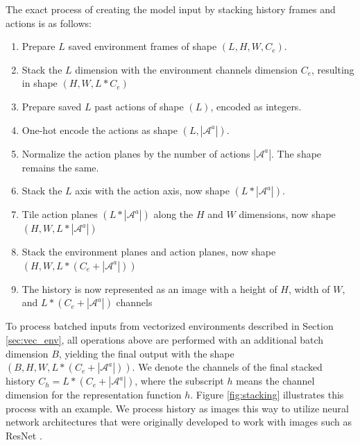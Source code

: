 The exact process of creating the model input by stacking history frames and actions is as follows:
\begin{enumerate}
    \item Prepare $L$ saved environment frames of shape $(L, H, W, C_e)$.
    \item Stack the $L$ dimension with the environment channels dimension $C_e$, resulting in shape $(H, W, L * C_e)$
    \item Prepare saved $L$ past actions of shape $(L)$, encoded as integers.
    \item One-hot encode the actions as shape $(L, |\mathcal{A}^a|)$.
    \item Normalize the action planes by the number of actions $|\mathcal{A}^a|$. The shape remains the same.
    \item Stack the $L$ axis with the action axis, now shape $(L * |\mathcal{A}^a|)$.
    \item Tile action planes $(L * |\mathcal{A}^a|)$ along the $H$ and $W$ dimensions, now shape $(H, W, L * |\mathcal{A}^a|)$
    \item Stack the environment planes and action planes, now shape $(H, W, L * (C_e + |\mathcal{A}^a|))$
    \item The history is now represented as an image with a height of $H$, width of $W$, and $L * (C_e + |\mathcal{A}^a|)$ channels
\end{enumerate}

To process batched inputs from vectorized environments described in Section \ref{sec:vec_env}, all operations above are performed with an additional batch dimension $B$, yielding the final output with the shape $(B, H, W, L * (C_e + |\mathcal{A}^a|))$.
We denote the channels of the final stacked history $C_h = L * (C_e + |\mathcal{A}^a|)$, where the subscript $h$ means the channel dimension for the representation function $h$.
Figure \ref{fig:stacking} illustrates this process with an example.
We process history as images this way to utilize neural network architectures that were originally developed to work with images such as ResNet \cite{DeepResidualLearning_He.Zhang.ea_2016}.

